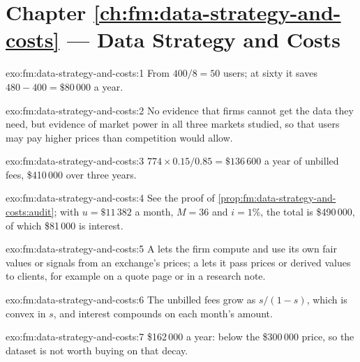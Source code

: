 \section*{Chapter \ref{ch:fm:data-strategy-and-costs} --- Data Strategy and Costs}

\begin{solution}{exo:fm:data-strategy-and-costs:1}
From $400/8=50$ users; at sixty it saves $480-400=\$80\,000$ a year.
\end{solution}

\begin{solution}{exo:fm:data-strategy-and-costs:2}
No evidence that firms cannot get the data they need, but evidence of market power in all three markets studied, so that users may pay higher
prices than competition would allow.
\end{solution}

\begin{solution}{exo:fm:data-strategy-and-costs:3}
$774\times0.15/0.85=\$136\,600$ a year of unbilled fees, \$410\,000 over three years.
\end{solution}

\begin{solution}{exo:fm:data-strategy-and-costs:4}
See the proof of \cref{prop:fm:data-strategy-and-costs:audit}; with $u=\$11\,382$ a month, $M=36$ and $i=1\%$, the total is \$490\,000, of which
\$81\,000 is interest.
\end{solution}

\begin{solution}{exo:fm:data-strategy-and-costs:5}
A  lets the firm compute and use its own fair values or signals from an exchange's prices; a  lets it
pass prices or derived values to clients, for example on a quote page or in a research note.
\end{solution}

\begin{solution}{exo:fm:data-strategy-and-costs:6}
The unbilled fees grow as $s/(1-s)$, which is convex in $s$, and interest compounds on each month's amount.
\end{solution}

\begin{solution}{exo:fm:data-strategy-and-costs:7}
\$162\,000 a year: below the \$300\,000 price, so the dataset is not worth buying on that decay.
\end{solution}

